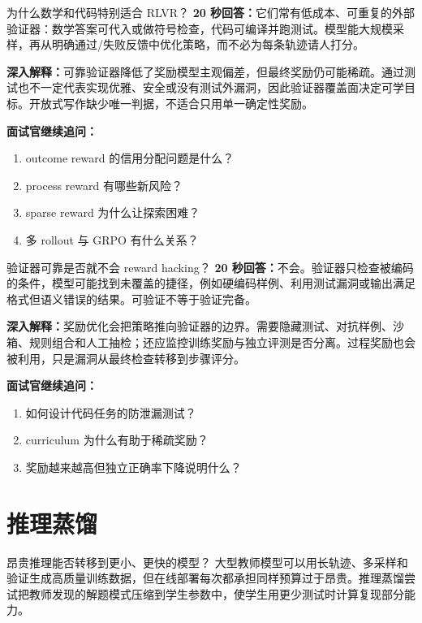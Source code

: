 \begin{interviewbox}{为什么数学和代码特别适合 RLVR？}
\textbf{20 秒回答：}它们常有低成本、可重复的外部验证器：数学答案可代入或做符号检查，代码可编译并跑测试。模型能大规模采样，再从明确通过/失败反馈中优化策略，而不必为每条轨迹请人打分。

\textbf{深入解释：}可靠验证器降低了奖励模型主观偏差，但最终奖励仍可能稀疏。通过测试也不一定代表实现优雅、安全或没有测试外漏洞，因此验证器覆盖面决定可学目标。开放式写作缺少唯一判据，不适合只用单一确定性奖励。

\textbf{面试官继续追问：}
\begin{enumerate}
  \item outcome reward 的信用分配问题是什么？
  \item process reward 有哪些新风险？
  \item sparse reward 为什么让探索困难？
  \item 多 rollout 与 GRPO 有什么关系？
\end{enumerate}
\end{interviewbox}

\begin{interviewbox}{验证器可靠是否就不会 reward hacking？}
\textbf{20 秒回答：}不会。验证器只检查被编码的条件，模型可能找到未覆盖的捷径，例如硬编码样例、利用测试漏洞或输出满足格式但语义错误的结果。可验证不等于验证完备。

\textbf{深入解释：}奖励优化会把策略推向验证器的边界。需要隐藏测试、对抗样例、沙箱、规则组合和人工抽检；还应监控训练奖励与独立评测是否分离。过程奖励也会被利用，只是漏洞从最终检查转移到步骤评分。

\textbf{面试官继续追问：}
\begin{enumerate}
  \item 如何设计代码任务的防泄漏测试？
  \item curriculum 为什么有助于稀疏奖励？
  \item 奖励越来越高但独立正确率下降说明什么？
\end{enumerate}
\end{interviewbox}

\chapter{推理蒸馏}
\label{sec:reasoning-distillation}

\begin{motivationbox}{昂贵推理能否转移到更小、更快的模型？}
大型教师模型可以用长轨迹、多采样和验证生成高质量训练数据，但在线部署每次都承担同样预算过于昂贵。推理蒸馏尝试把教师发现的解题模式压缩到学生参数中，使学生用更少测试时计算复现部分能力。
\end{motivationbox}

